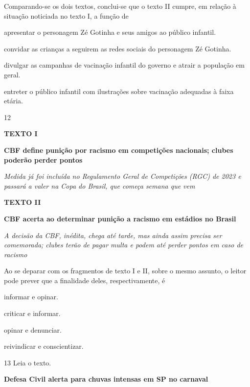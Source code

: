 Comparando-se os dois textos, conclui-se que o texto II cumpre, em
relação à situação noticiada no texto I, a função de

\begin{escolha}
\item apresentar o personagem Zé Gotinha e seus amigos ao público infantil.

\item convidar as crianças a seguirem as redes sociais do personagem Zé Gotinha.

\item divulgar as campanhas de vacinação infantil do governo e atrair a população em geral.

\item entreter o público infantil com ilustrações sobre vacinação adequadas
à faixa etária.
\end{escolha}

\num{12}

\textbf{TEXTO I}

\textbf{CBF define punição por racismo em competições nacionais; clubes poderão perder pontos}

\textit{Medida já foi incluída no Regulamento Geral de Competições (RGC) de 2023 e passará a valer na Copa do Brasil, que começa semana que vem}


\textbf{TEXTO II}

\textbf{CBF acerta ao determinar punição a racismo em estádios no Brasil}

\textit{A decisão da CBF, inédita, chega até tarde, mas ainda assim precisa ser comemorada; clubes terão de pagar multa e podem até perder pontos em caso de racismo}

Ao se deparar com os fragmentos de texto I e II, sobre o mesmo assunto,
o leitor pode prever que a finalidade deles, respectivamente, é

\begin{escolha}
\item informar e opinar.

\item criticar e informar.

\item opinar e denunciar.

\item reivindicar e conscientizar.
\end{escolha}

\num{13} Leia o texto.

\textbf{Defesa Civil alerta para chuvas intensas em SP no carnaval}

